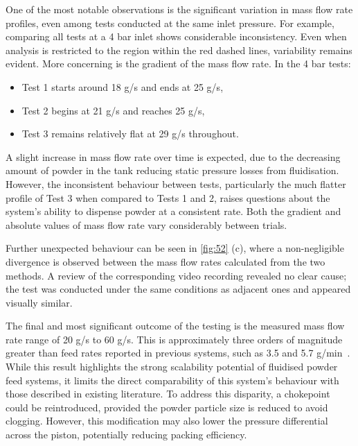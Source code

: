 One of the most notable observations is the significant variation in mass flow rate profiles, even among tests conducted at the same inlet pressure. For example, comparing all tests at a 4 bar inlet shows considerable inconsistency. Even when analysis is restricted to the region within the red dashed lines, variability remains evident. More concerning is the gradient of the mass flow rate. In the 4 bar tests:
\begin{itemize}
    \item Test 1 starts around 18 g/s and ends at 25 g/s,
    \item Test 2 begins at 21 g/s and reaches 25 g/s,
    \item Test 3 remains relatively flat at 29 g/s throughout.
\end{itemize}
A slight increase in mass flow rate over time is expected, due to the decreasing amount of powder in the tank reducing static pressure losses from fluidisation. However, the inconsistent behaviour between tests, particularly the much flatter profile of Test 3 when compared to Tests 1 and 2, raises questions about the system's ability to dispense powder at a consistent rate. Both the gradient and absolute values of mass flow rate vary considerably between trials.

Further unexpected behaviour can be seen in \autoref{fig:52} (c), where a non-negligible divergence is observed between the mass flow rates calculated from the two methods. A review of the corresponding video recording revealed no clear cause; the test was conducted under the same conditions as adjacent ones and appeared visually similar.

The final and most significant outcome of the testing is the measured mass flow rate range of 20 g/s to 60 g/s. This is approximately three orders of magnitude greater than feed rates reported in previous systems, such as 3.5 and 5.7 g/min~\cite{BHATTIPROLU20181}. While this result highlights the strong scalability potential of fluidised powder feed systems, it limits the direct comparability of this system's behaviour with those described in existing literature. To address this disparity, a chokepoint could be reintroduced, provided the powder particle size is reduced to avoid clogging. However, this modification may also lower the pressure differential across the piston, potentially reducing packing efficiency.

